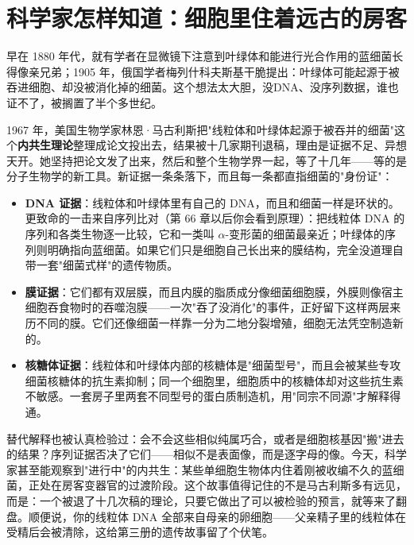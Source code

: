 \section{科学家怎样知道：细胞里住着远古的房客}

\begin{zhengju}
早在 1880 年代，就有学者在显微镜下注意到叶绿体和能进行光合作用的蓝细菌长得像亲兄弟；1905 年，俄国学者梅列什科夫斯基干脆提出：叶绿体可能起源于被吞进细胞、却没被消化掉的细菌。这个想法太大胆，没DNA、没序列数据，谁也证不了，被搁置了半个多世纪。

1967 年，美国生物学家林恩·马古利斯把"线粒体和叶绿体起源于被吞并的细菌"这个\textbf{内共生理论}整理成论文投出去，结果被十几家期刊退稿，理由是证据不足、异想天开。她坚持把论文发了出来，然后和整个生物学界一起，等了十几年——等的是分子生物学的新工具。新证据一条条落下，而且每一条都直指细菌的"身份证"：

\begin{itemize}[itemsep=2pt]
\item \textbf{DNA 证据}：线粒体和叶绿体里有自己的 DNA，而且和细菌一样是环状的。更致命的一击来自序列比对（第 66 章以后你会看到原理）：把线粒体 DNA 的序列和各类生物逐一比较，它和一类叫 $\alpha$-变形菌的细菌最亲近；叶绿体的序列则明确指向蓝细菌。如果它们只是细胞自己长出来的膜结构，完全没道理自带一套"细菌式样"的遗传物质。
\item \textbf{膜证据}：它们都有双层膜，而且内膜的脂质成分像细菌细胞膜，外膜则像宿主细胞吞食物时的吞噬泡膜——一次"吞了没消化"的事件，正好留下这样两层来历不同的膜。它们还像细菌一样靠一分为二地分裂增殖，细胞无法凭空制造新的。
\item \textbf{核糖体证据}：线粒体和叶绿体内部的核糖体是"细菌型号"，而且会被某些专攻细菌核糖体的抗生素抑制；同一个细胞里，细胞质中的核糖体却对这些抗生素不敏感。一套房子里两套不同型号的蛋白质制造机，用"同宗不同源"才解释得通。
\end{itemize}

替代解释也被认真检验过：会不会这些相似纯属巧合，或者是细胞核基因"搬"进去的结果？序列证据否决了它们——相似不是表面像，而是逐字母的像。今天，科学家甚至能观察到"进行中"的内共生：某些单细胞生物体内住着刚被收编不久的蓝细菌，正处在房客变器官的过渡阶段。这个故事值得记住的不是马古利斯多有远见，而是：一个被退了十几次稿的理论，只要它做出了可以被检验的预言，就等来了翻盘。顺便说，你的线粒体 DNA 全部来自母亲的卵细胞——父亲精子里的线粒体在受精后会被清除，这给第三册的遗传故事留了个伏笔。
\end{zhengju}

